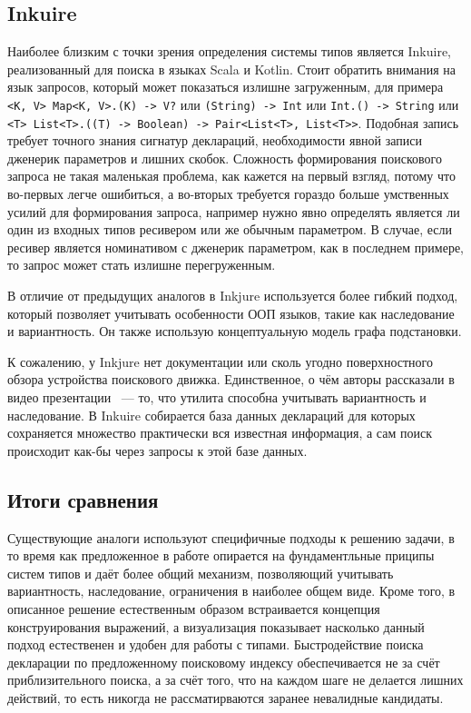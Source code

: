 \documentclass[times]{itmo-student-thesis}
\begin{document}
	\subsection{Inkuire}
	Наиболее близким с точки зрения определения системы типов является Inkuire, реализованный для поиска в языках Scala и Kotlin. Стоит обратить внимания на язык запросов, который может показаться излишне загруженным, для примера \lstinline{<K, V> Map<K, V>.(K) -> V?} или \lstinline{(String) -> Int} или \lstinline{Int.() -> String} или \lstinline{<T> List<T>.((T) -> Boolean) -> Pair<List<T>, List<T>>}. Подобная запись требует точного знания сигнатур деклараций, необходимости явной записи дженерик параметров и лишних скобок. Сложность формирования поискового запроса не такая маленькая проблема, как кажется на первый взгляд, потому что во-первых легче ошибиться, а во-вторых требуется гораздо больше умственных усилий для формирования запроса, например нужно явно определять является ли один из входных типов ресивером или же обычным параметром. В случае, если ресивер является номинативом с дженерик параметром, как в последнем примере, то запрос может стать излишне перегруженным.
	
	В отличие от предыдущих аналогов в Inkjure используется более гибкий подход, который позволяет учитывать особенности ООП языков, такие как наследование и вариантность. Он также использую концептуальную модель графа подстановки.
	
	К сожалению, у Inkjure нет документации или сколь угодно поверхностного обзора устройства поискового движка. Единственное, о чём авторы рассказали в видео презентации~\cite{inkuirerepresentation} --- то, что утилита способна учитывать вариантность и наследование. В Inkuire собирается база данных деклараций для которых сохраняется множество практически вся известная информация, а сам поиск происходит как-бы через запросы к этой базе данных. 
	
	\subsection{Итоги сравнения}
	Существующие аналоги используют специфичные подходы к решению задачи, в то время как предложенное в работе опирается на фундаментльные приципы систем типов и даёт более общий механизм, позволяющий учитывать вариантность, наследование, ограничения в наиболее общем виде. Кроме того, в описанное решение естественным образом встраивается концепция конструирования выражений, а визуализация показывает насколько данный подход естественен и удобен для работы с типами.
	Быстродействие поиска декларации по предложенному поисковому индексу обеспечивается не за счёт приблизительного поиска, а за счёт того, что на каждом шаге не делается лишних действий, то есть никогда не рассматирваются заранее невалидные кандидаты. 
	
\end{document}
